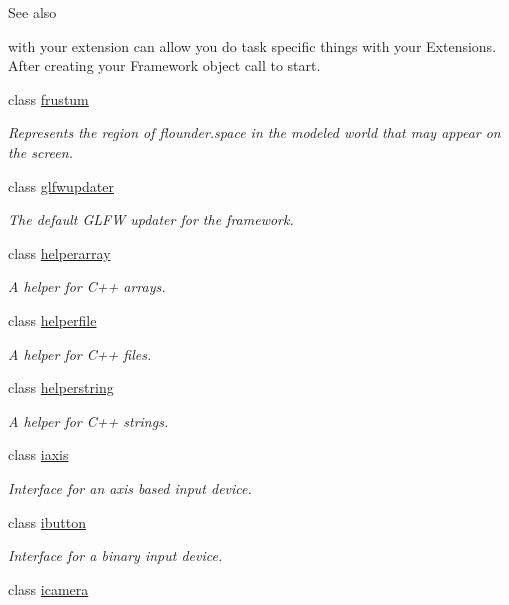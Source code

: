 \begin{DoxyCompactItemize}
\begin{DoxyCompactList}
\begin{DoxySeeAlso}{See also}
\end{DoxySeeAlso}
with your extension can allow you do task specific things with your Extensions. After creating your Framework object call  to start. \end{DoxyCompactList}\item 
class \hyperlink{classflounder_1_1frustum}{frustum}
\begin{DoxyCompactList}\small\item\em Represents the region of flounder.\+space in the modeled world that may appear on the screen. \end{DoxyCompactList}\item 
class \hyperlink{classflounder_1_1glfwupdater}{glfwupdater}
\begin{DoxyCompactList}\small\item\em The default G\+L\+FW updater for the framework. \end{DoxyCompactList}\item 
class \hyperlink{classflounder_1_1helperarray}{helperarray}
\begin{DoxyCompactList}\small\item\em A helper for C++ arrays. \end{DoxyCompactList}\item 
class \hyperlink{classflounder_1_1helperfile}{helperfile}
\begin{DoxyCompactList}\small\item\em A helper for C++ files. \end{DoxyCompactList}\item 
class \hyperlink{classflounder_1_1helperstring}{helperstring}
\begin{DoxyCompactList}\small\item\em A helper for C++ strings. \end{DoxyCompactList}\item 
class \hyperlink{classflounder_1_1iaxis}{iaxis}
\begin{DoxyCompactList}\small\item\em Interface for an axis based input device. \end{DoxyCompactList}\item 
class \hyperlink{classflounder_1_1ibutton}{ibutton}
\begin{DoxyCompactList}\small\item\em Interface for a binary input device. \end{DoxyCompactList}\item 
class \hyperlink{classflounder_1_1icamera}{icamera}

\end{DoxyCompactItemize}
